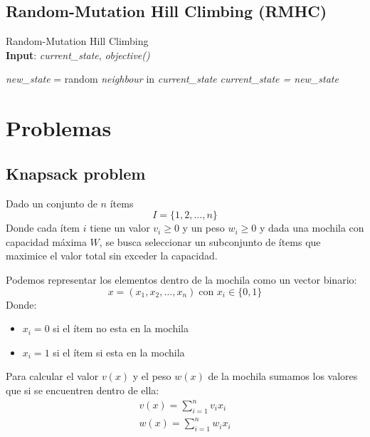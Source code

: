 \documentclass[12pt,twoside]{article}
\begin{document}
	\subsection{Random-Mutation Hill Climbing (RMHC)}
	
	\begin{algorithm}[H]
		\caption{Random-Mutation Hill Climbing\\ \textbf{Input}: \textit{current\_state}, \textit{objective()}}
		\begin{algorithmic}[1]
			\State \textit{new\_state} = random \textit{neighbour} in \textit{current\_state}
			\State	\textit{current\_state = new\_state}
			\EndIf \\
		\end{algorithmic}
		\label{alg:rmhc}
	\end{algorithm}
	

	\clearpage
	\section{Problemas}
	
	\subsection{Knapsack problem}
	
	Dado un conjunto de $n$ ítems \[I = \{1,2, \dots, n \}\] Donde cada ítem $i$ tiene un valor $v_i \geq 0$ y un peso $w_i \geq 0$ y dada una mochila con capacidad máxima $W$, se busca seleccionar un subconjunto de ítems que maximice el valor total sin exceder la capacidad.
	
	Podemos representar los elementos dentro de la mochila como un vector binario: 
	\[ x = (x_1, x_2, \dots , x_n) \; \text{con } x_i \in \{0, 1\} \]
	Donde:
	\begin{itemize}
		\item $x_i = 0$ si el ítem no esta en la mochila
		\item $x_i = 1$ si el ítem si esta en la mochila
	\end{itemize}
	
	Para calcular el valor $v(x)$ y el peso $w(x)$ de la mochila sumamos los valores que si se encuentren dentro de ella:
	\begin{gather*}
		v(x) = \sum_{i = 1}^{n} v_i x_i \\
		w(x) = \sum_{i = 1}^{n} w_i x_i 
	\end{gather*}
	
\end{document}

